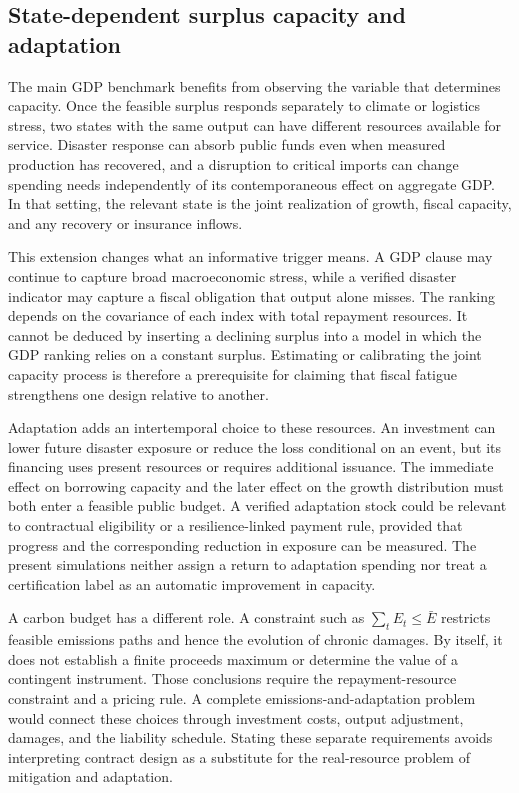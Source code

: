 \subsection{State-dependent surplus capacity and adaptation}\label{app:adaptation}
The main GDP benchmark benefits from observing the variable that determines capacity. Once the feasible surplus responds separately to climate or logistics stress, two states with the same output can have different resources available for service. Disaster response can absorb public funds even when measured production has recovered, and a disruption to critical imports can change spending needs independently of its contemporaneous effect on aggregate GDP. In that setting, the relevant state is the joint realization of growth, fiscal capacity, and any recovery or insurance inflows.

This extension changes what an informative trigger means. A GDP clause may continue to capture broad macroeconomic stress, while a verified disaster indicator may capture a fiscal obligation that output alone misses. The ranking depends on the covariance of each index with total repayment resources. It cannot be deduced by inserting a declining surplus into a model in which the GDP ranking relies on a constant surplus. Estimating or calibrating the joint capacity process is therefore a prerequisite for claiming that fiscal fatigue strengthens one design relative to another.

Adaptation adds an intertemporal choice to these resources. An investment can lower future disaster exposure or reduce the loss conditional on an event, but its financing uses present resources or requires additional issuance. The immediate effect on borrowing capacity and the later effect on the growth distribution must both enter a feasible public budget. A verified adaptation stock could be relevant to contractual eligibility or a resilience-linked payment rule, provided that progress and the corresponding reduction in exposure can be measured. The present simulations neither assign a return to adaptation spending nor treat a certification label as an automatic improvement in capacity.

A carbon budget has a different role. A constraint such as $\sum_t E_t\le\bar E$ restricts feasible emissions paths and hence the evolution of chronic damages. By itself, it does not establish a finite proceeds maximum or determine the value of a contingent instrument. Those conclusions require the repayment-resource constraint and a pricing rule. A complete emissions-and-adaptation problem would connect these choices through investment costs, output adjustment, damages, and the liability schedule. Stating these separate requirements avoids interpreting contract design as a substitute for the real-resource problem of mitigation and adaptation.


